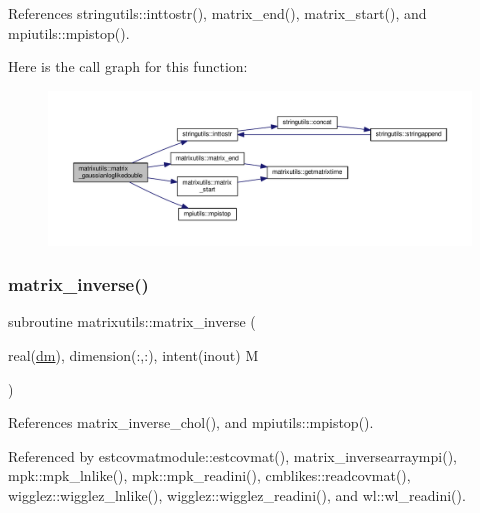References stringutils\+::inttostr(), matrix\+\_\+end(), matrix\+\_\+start(), and mpiutils\+::mpistop().

Here is the call graph for this function\+:
\nopagebreak
\begin{figure}[H]
\begin{center}
\leavevmode
\includegraphics[width=350pt]{namespacematrixutils_ab48ad701f7ef749e5bea654c83ac4544_cgraph}
\end{center}
\end{figure}
\mbox{\label{namespacematrixutils_aac7ea35062daeadd8fb4ebc86cb42e7a}} 
\subsubsection{\texorpdfstring{matrix\+\_\+inverse()}{matrix\_inverse()}}
{\footnotesize\ttfamily subroutine matrixutils\+::matrix\+\_\+inverse (\begin{DoxyParamCaption}\item[{real(\mbox{\hyperlink{namespacematrixutils_a7bdc564986ea4d90f51201c75606ef3d}{dm}}), dimension(\+:,\+:), intent(inout)}]{M }\end{DoxyParamCaption})}



References matrix\+\_\+inverse\+\_\+chol(), and mpiutils\+::mpistop().



Referenced by estcovmatmodule\+::estcovmat(), matrix\+\_\+inversearraympi(), mpk\+::mpk\+\_\+lnlike(), mpk\+::mpk\+\_\+readini(), cmblikes\+::readcovmat(), wigglez\+::wigglez\+\_\+lnlike(), wigglez\+::wigglez\+\_\+readini(), and wl\+::wl\+\_\+readini().

